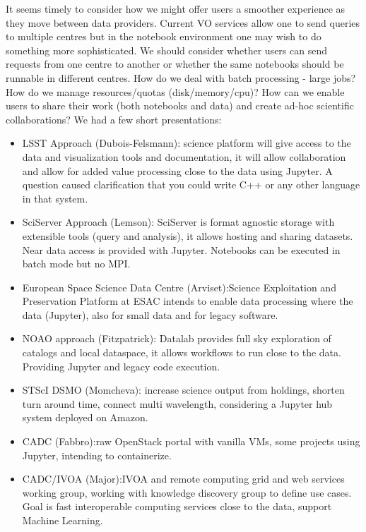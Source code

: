 \documentclass[11pt,twoside]{article}
\begin{document}
It seems timely to consider how we might offer users a smoother experience as they move between data providers.
Current VO services allow one to send queries to multiple centres but in the notebook environment one may wish to do something more sophisticated. We should consider whether users can send requests from one centre to another or whether the same notebooks should be runnable in different centres.
How do we deal with batch processing - large jobs? How do we manage resources/quotas (disk/memory/cpu)?  How can we enable users to share their work (both notebooks and data) and create ad-hoc scientific collaborations?
We had a few short presentations:
\begin{itemize}
\item LSST Approach (Dubois-Felsmann): science platform will give access to the data and visualization tools and documentation, it will allow collaboration and allow for added value processing close to the data using Jupyter. A question caused clarification that you could write C++ or any other language in that system.

\item SciServer Approach (Lemson): SciServer is format agnostic storage with extensible tools (query and analysis), it allows hosting and sharing datasets. Near data access is provided with Jupyter. Notebooks can be executed in batch mode but no MPI.

\item European Space Science Data Centre (Arviset):Science Exploitation and Preservation Platform at ESAC
intends to enable data processing where the data (Jupyter), also for small data and for legacy software.

\item NOAO approach (Fitzpatrick): Datalab provides full sky exploration of catalogs and local dataspace, it allows workflows to run close to the data. Providing Jupyter and legacy code execution.

\item STScI DSMO (Momcheva): increase science output from holdings, shorten turn around time, connect multi wavelength, considering a Jupyter hub system deployed on Amazon.

\item CADC (Fabbro):raw OpenStack portal with vanilla VMs, some projects using Jupyter, intending  to containerize.

\item CADC/IVOA (Major):IVOA and remote computing
grid and web services working group, working with knowledge discovery group to define use cases.
Goal is fast interoperable computing services close to the data, support Machine Learning.
\end{itemize}
\end{document}
